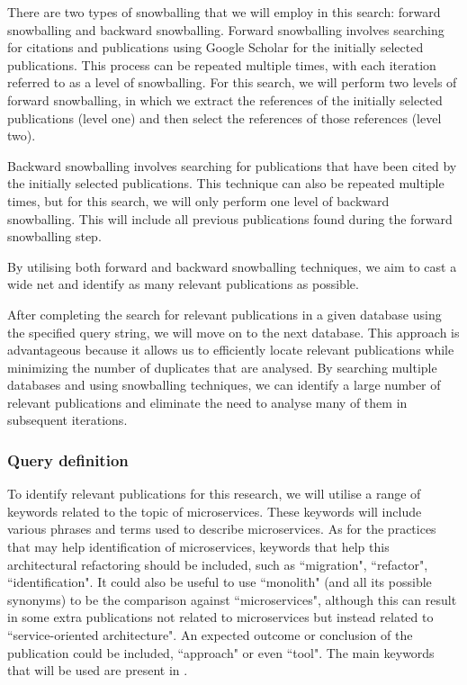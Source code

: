 \documentclass[conference]{IEEEtran}
\begin{document}
There are two types of snowballing that we will employ in this search: forward
snowballing and backward snowballing. Forward snowballing involves searching
for citations and publications using Google Scholar for the initially selected
publications. This process can be repeated multiple times, with each iteration
referred to as a level of snowballing. For this search, we will
perform two levels of forward snowballing, in which we extract the references
of the initially selected publications (level one) and then select the
references of those references (level two).

Backward snowballing involves searching for publications that have been cited
by the initially selected publications. This technique can also be repeated
multiple times, but for this search, we will only perform one
level of backward snowballing. This will include all previous publications
found during the forward snowballing step.

By utilising both forward and backward snowballing techniques, we aim to cast a
wide net and identify as many relevant publications as possible.

After completing the search for relevant publications in a given database using
the specified query string, we will move on to the next database. This approach
is advantageous because it allows us to efficiently locate relevant
publications while minimizing the number of duplicates that are analysed. By
searching multiple databases and using snowballing techniques, we can identify
a large number of relevant publications and eliminate the need to analyse many
of them in subsequent iterations.

\subsubsection{Query definition}

To identify relevant publications for this research, we will utilise a range of
keywords related to the topic of microservices. These keywords will include
various phrases and terms used to describe microservices. As for the practices
that may help identification of microservices, keywords that help this
architectural refactoring should be included, such as ``migration",
``refactor", ``identification". It could also be useful to use ``monolith" (and
all its possible synonyms) to be the comparison against ``microservices",
although this can result in some extra publications not related to
microservices but instead related to ``service-oriented architecture". An
expected outcome or conclusion of the publication could be included,
``approach" or even ``tool". The main keywords that will be used are present in
.
\end{document}
